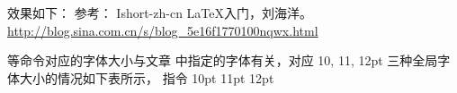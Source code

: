 效果如下：
参考： Ishort-zh-cn LaTeX入门，刘海洋。
\url{http://blog.sina.com.cn/s/blog_5e16f1770100nqwx.html}













 等命令对应的字体大小与文章  中指定的字体有关，对应
10, 11, 12pt 三种全局字体大小的情况如下表所示， 指令 10pt 11pt 12pt




